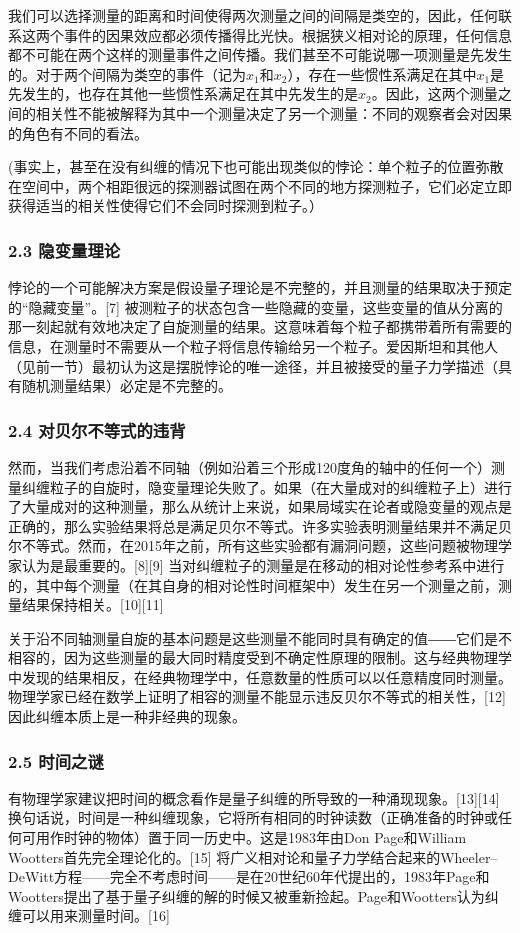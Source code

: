        我们可以选择测量的距离和时间使得两次测量之间的间隔是类空的，因此，任何联系这两个事件的因果效应都必须传播得比光快。根据狭义相对论的原理，任何信息都不可能在两个这样的测量事件之间传播。我们甚至不可能说哪一项测量是先发生的。对于两个间隔为类空的事件（记为$x_{1}$和$x_{2}$），存在一些惯性系满足在其中$x_{1}$是先发生的，也存在其他一些惯性系满足在其中先发生的是$x_{2}$。因此，这两个测量之间的相关性不能被解释为其中一个测量决定了另一个测量：不同的观察者会对因果的角色有不同的看法。

(事实上，甚至在没有纠缠的情况下也可能出现类似的悖论：单个粒子的位置弥散在空间中，两个相距很远的探测器试图在两个不同的地方探测粒子，它们必定立即获得适当的相关性使得它们不会同时探测到粒子。）

\subsubsection{2.3 隐变量理论}
 悖论的一个可能解决方案是假设量子理论是不完整的，并且测量的结果取决于预定的“隐藏变量”。[7] 被测粒子的状态包含一些隐藏的变量，这些变量的值从分离的那一刻起就有效地决定了自旋测量的结果。这意味着每个粒子都携带着所有需要的信息，在测量时不需要从一个粒子将信息传输给另一个粒子。爱因斯坦和其他人（见前一节）最初认为这是摆脱悖论的唯一途径，并且被接受的量子力学描述（具有随机测量结果）必定是不完整的。

\subsubsection{2.4 对贝尔不等式的违背}
然而，当我们考虑沿着不同轴（例如沿着三个形成120度角的轴中的任何一个）测量纠缠粒子的自旋时，隐变量理论失败了。如果（在大量成对的纠缠粒子上）进行了大量成对的这种测量，那么从统计上来说，如果局域实在论者或隐变量的观点是正确的，那么实验结果将总是满足贝尔不等式。许多实验表明测量结果并不满足贝尔不等式。然而，在2015年之前，所有这些实验都有漏洞问题，这些问题被物理学家认为是最重要的。[8][9] 当对纠缠粒子的测量是在移动的相对论性参考系中进行的，其中每个测量（在其自身的相对论性时间框架中）发生在另一个测量之前，测量结果保持相关。[10][11]

关于沿不同轴测量自旋的基本问题是这些测量不能同时具有确定的值――它们是不相容的，因为这些测量的最大同时精度受到不确定性原理的限制。这与经典物理学中发现的结果相反，在经典物理学中，任意数量的性质可以以任意精度同时测量。物理学家已经在数学上证明了相容的测量不能显示违反贝尔不等式的相关性，[12] 因此纠缠本质上是一种非经典的现象。

\subsubsection{2.5 时间之谜}
有物理学家建议把时间的概念看作是量子纠缠的所导致的一种涌现现象。[13][14] 换句话说，时间是一种纠缠现象，它将所有相同的时钟读数（正确准备的时钟或任何可用作时钟的物体）置于同一历史中。这是1983年由Don Page和William Wootters首先完全理论化的。[15] 将广义相对论和量子力学结合起来的Wheeler–DeWitt方程——完全不考虑时间——是在20世纪60年代提出的，1983年Page和Wootters提出了基于量子纠缠的解的时候又被重新捡起。Page和Wootters认为纠缠可以用来测量时间。[16]

